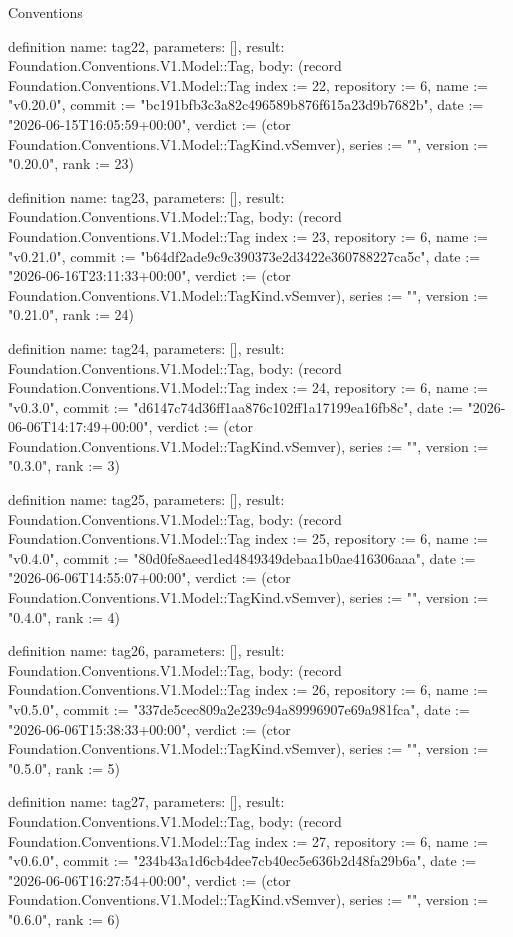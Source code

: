 \begin{lexlean}{Conventions}
\begin{semanticmodule}
definition{
  name: tag22,
  parameters: [],
  result: Foundation.Conventions.V1.Model::Tag,
  body: (record Foundation.Conventions.V1.Model::Tag {index := 22, repository := 6, name := "v0.20.0", commit := "bc191bfb3c3a82c496589b876f615a23d9b7682b", date := "2026-06-15T16:05:59+00:00", verdict := (ctor Foundation.Conventions.V1.Model::TagKind.vSemver), series := "", version := "0.20.0", rank := 23})
}

definition{
  name: tag23,
  parameters: [],
  result: Foundation.Conventions.V1.Model::Tag,
  body: (record Foundation.Conventions.V1.Model::Tag {index := 23, repository := 6, name := "v0.21.0", commit := "b64df2ade9c9c390373e2d3422e360788227ca5c", date := "2026-06-16T23:11:33+00:00", verdict := (ctor Foundation.Conventions.V1.Model::TagKind.vSemver), series := "", version := "0.21.0", rank := 24})
}

definition{
  name: tag24,
  parameters: [],
  result: Foundation.Conventions.V1.Model::Tag,
  body: (record Foundation.Conventions.V1.Model::Tag {index := 24, repository := 6, name := "v0.3.0", commit := "d6147c74d36ff1aa876c102ff1a17199ea16fb8c", date := "2026-06-06T14:17:49+00:00", verdict := (ctor Foundation.Conventions.V1.Model::TagKind.vSemver), series := "", version := "0.3.0", rank := 3})
}

definition{
  name: tag25,
  parameters: [],
  result: Foundation.Conventions.V1.Model::Tag,
  body: (record Foundation.Conventions.V1.Model::Tag {index := 25, repository := 6, name := "v0.4.0", commit := "80d0fe8aeed1ed4849349debaa1b0ae416306aaa", date := "2026-06-06T14:55:07+00:00", verdict := (ctor Foundation.Conventions.V1.Model::TagKind.vSemver), series := "", version := "0.4.0", rank := 4})
}

definition{
  name: tag26,
  parameters: [],
  result: Foundation.Conventions.V1.Model::Tag,
  body: (record Foundation.Conventions.V1.Model::Tag {index := 26, repository := 6, name := "v0.5.0", commit := "337de5cec809a2e239c94a89996907e69a981fca", date := "2026-06-06T15:38:33+00:00", verdict := (ctor Foundation.Conventions.V1.Model::TagKind.vSemver), series := "", version := "0.5.0", rank := 5})
}

definition{
  name: tag27,
  parameters: [],
  result: Foundation.Conventions.V1.Model::Tag,
  body: (record Foundation.Conventions.V1.Model::Tag {index := 27, repository := 6, name := "v0.6.0", commit := "234b43a1d6cb4dee7cb40ec5e636b2d48fa29b6a", date := "2026-06-06T16:27:54+00:00", verdict := (ctor Foundation.Conventions.V1.Model::TagKind.vSemver), series := "", version := "0.6.0", rank := 6})
}


\end{semanticmodule}
\end{lexlean}
